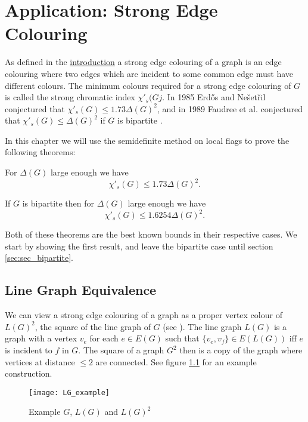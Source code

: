 \chapter{Application: Strong Edge Colouring}
\label{chap:strong_edge_colouring}

As defined in the \hyperref[sec:intro_strong_edge_coloring]{introduction}
a strong edge colouring of a graph is an edge colouring where two edges which are incident to some
common edge must have different colours. The minimum colours required for a strong edge colouring of
$G$ is called the strong chromatic index $\chi'_s(Gj$.
In 1985 Erd\H{o}s and Nešetřil conjectured that
$\chi'_s(G) \leq 1.73\Delta(G)^2$, and in 1989 Faudree et al. conjectured that
$\chi'_s(G) \leq \Delta(G)^2$ if $G$ is bipartite \cite{faudreeInducedMatchingsBipartite1989}.

In this chapter we will use the semidefinite method on local flags to prove the following
theorems:
\begin{knowntheorem}
    For $\Delta(G)$ large enough we have
    \[\chi'_s(G) \leq 1.73\Delta(G)^2.\]
\end{knowntheorem}
\begin{knowntheorem}
    If $G$ is bipartite then for $\Delta(G)$ large enough we have
    \[\chi'_s(G) \leq 1.6254\Delta(G)^2.\]
\end{knowntheorem}
Both of these theorems are the best known bounds in their respective cases. We start
by showing the first result, and leave the bipartite case until section
\ref{sec:sec_bipartite}.

\section{Line Graph Equivalence}

We can view a strong edge colouring of a graph as a proper vertex colour of $L(G)^2$, the
square of the line graph of $G$ (see \cite{molloyBoundStrongChromatic1997}).
The line graph $L(G)$ is a graph with a vertex $v_e$ for
each $e\in E(G)$ such that $\{v_e, v_f\} \in E(L(G))$ iff $e$ is incident to $f$ in
$G$. The square of a graph $G^2$ then is a copy of the graph where vertices at distance $\leq 2$
are connected. See figure \ref{fig:lg_example} for an example construction.

\begin{figure}[ht]
    \centering
    \texttt{[image: LG\_example]}
    \caption{Example $G$, $L(G)$ and $L(G)^2$}
    \label{fig:lg_example}
\end{figure}

